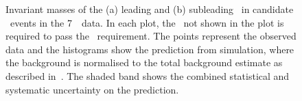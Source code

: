 \begin{figure}[htbp]
    \begin{center}
    \caption[Invariant masses of the leading and subleading \leppair\
    in candidate \ZZ\ events in the 7~\tev\ data.]
    {Invariant masses of the (a) leading and (b) subleading \leppair\ in
    candidate \ZZ\ events in the 7~\tev\ data. In each plot, the \leppair\
    not shown in the plot is required to pass the \sstooos\
    requirement. The points represent the observed data and the histograms show
    the prediction from simulation, where the background is normalised to the
    total background estimate as described in~.  The
    shaded band shows the combined statistical and systematic uncertainty on the
    prediction. 
}
    \label{fig:zzdists-Zmass-seven}
\end{center}
\end{figure}

